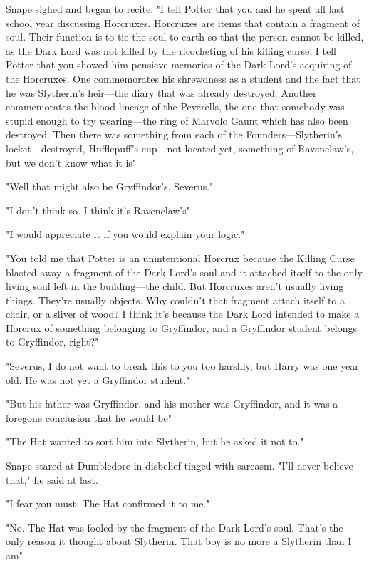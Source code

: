 Snape sighed and began to recite. "I tell Potter that you and he spent all last school year discussing Horcruxes. Horcruxes are items that contain a fragment of soul. Their function is to tie the soul to earth so that the person cannot be killed, as the Dark Lord was not killed by the ricocheting of his killing curse. I tell Potter that you showed him pensieve memories of the Dark Lord's acquiring of the Horcruxes. One commemorates his shrewdness as a student and the fact that he was Slytherin's heir—the diary that was already destroyed. Another commemorates the blood lineage of the Peverells, the one that somebody was stupid enough to try wearing—the ring of Marvolo Gaunt which has also been destroyed. Then there was something from each of the Founders—Slytherin's locket—destroyed, Hufflepuff's cup—not located yet, something of Ravenclaw's, but we don't know what it is{\el}"

"Well that might also be Gryffindor's, Severus."

"I don't think so. I think it's Ravenclaw's"

"I would appreciate it if you would explain your logic."

"You told me that Potter is an unintentional Horcrux because the Killing Curse blasted away a fragment of the Dark Lord's soul and it attached itself to the only living soul left in the building—the child. But Horcruxes aren't usually living things. They're usually objects. Why couldn't that fragment attach itself to a chair, or a sliver of wood? I think it's because the Dark Lord intended to make a Horcrux of something belonging to Gryffindor, and a Gryffindor student belongs to Gryffindor, right?"

"Severus, I do not want to break this to you too harshly, but Harry was one year old. He was not yet a Gryffindor student."

"But his father was Gryffindor, and his mother was Gryffindor, and it was a foregone conclusion that he would be{\el}"

"The Hat wanted to sort him into Slytherin, but he asked it not to."

Snape stared at Dumbledore in disbelief tinged with sarcasm. "I'll never believe that," he said at last.

"I fear you must. The Hat confirmed it to me."

"No. The Hat was fooled by the fragment of the Dark Lord's soul. That's the only reason it thought about Slytherin. That boy is no more a Slytherin than I am{\el}"

